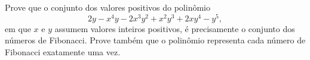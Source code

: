 Prove que o conjunto dos valores positivos do polinômio
\[2y − x^4y − 2x^3y^2 + x^2y^3 + 2xy^4 − y^5,\]
em que $x$ e $y$ assumem valores inteiros positivos, é precisamente o conjunto dos números de Fibonacci. Prove também que o polinômio representa cada número de Fibonacci exatamente uma vez.
